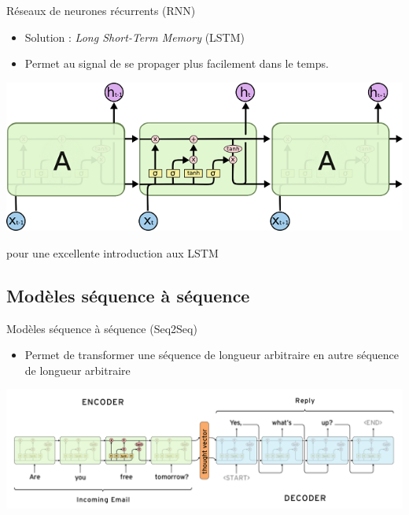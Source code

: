 \documentclass[french]{beamer}
\begin{document}
\begin{frame}{Réseaux de neurones récurrents (RNN)}
\begin{itemize}
	\item Solution : \textit{Long Short-Term Memory} (LSTM) \cite{hochreiter1997long}
	\item Permet au signal de se propager plus facilement dans le temps.
\end{itemize}

\centering
\includegraphics[width=.8\textwidth]{figures/lstm}

\raggedright
\cite{olah2015understanding} pour une excellente introduction aux LSTM

\end{frame}

\subsection{Modèles séquence à séquence}

\begin{frame}{Modèles séquence à séquence (Seq2Seq)\cite{cho2014learning}\cite{sutskever2014sequence}}
\begin{itemize}
	\item Permet de transformer une séquence de longueur arbitraire en autre séquence de longueur arbitraire
\end{itemize}
\begin{center}
\includegraphics[width=\textwidth]{figures/seq2seq}
\end{center}
\end{frame}

\end{document}
